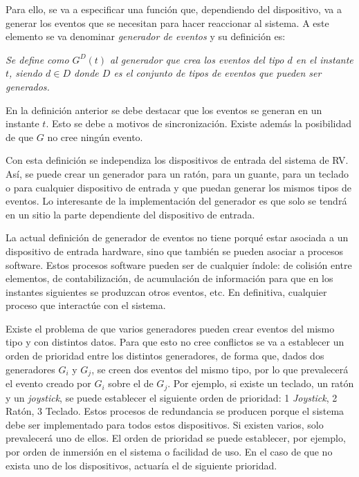 \documentclass{egpubl}
\begin{document}
Para ello, se va a especificar una funci\'on que, dependiendo del
dispositivo, va a generar los eventos que se necesitan para hacer
reaccionar al sistema. A este elemento se va denominar
\textit{generador de eventos} y su definici\'on es:


{\itshape
Se define como $G^{D}(t)$ al generador que crea los
eventos del tipo $d$ en el instante $t$, siendo $d \in D$ donde $D$ es el
conjunto de tipos de eventos que pueden ser generados.}


En la definici\'on anterior se debe destacar que los eventos se generan
en un instante $t$. Esto se debe a motivos de sincronizaci\'on. Existe
adem\'as la posibilidad de que $G$ no cree ning\'un evento.

Con esta definici\'on se independiza los dispositivos de entrada del
sistema de RV. As\'i, se puede crear un generador para un rat\'on,
para un guante, para un teclado o para cualquier dispositivo de entrada
y que puedan generar los mismos tipos de eventos. Lo interesante de la
implementaci\'on del generador es que solo se tendr\'a en un sitio la
parte dependiente del dispositivo de entrada.

La actual definici\'on de generador de eventos no tiene porqu\'e estar
asociada a un dispositivo de entrada hardware, sino que tambi\'en se
pueden asociar a procesos software. Estos procesos software pueden ser
de cualquier \'indole: de colisi\'on entre elementos, de
contabilizaci\'on, de acumulaci\'on de informaci\'on para que en los
instantes siguientes se produzcan otros eventos, etc. En definitiva,
cualquier proceso que interact\'ue con el sistema.

Existe el problema de que varios generadores pueden crear eventos del
mismo tipo y con distintos datos. Para que esto no cree conflictos se
va a establecer un orden de prioridad entre los distintos generadores,
de forma que, dados dos generadores $G_{i}$ y
$G_{j}$, se creen dos eventos del mismo tipo, por lo que
prevalecer\'a el evento creado por $G_{i}$ sobre el de
$G_{j}$. Por ejemplo, si existe un teclado, un rat\'on y un
\textit{joystick}, se puede establecer el siguiente orden de prioridad:
1{\textordmasculine} \textit{Joystick}, 2{\textordmasculine} Rat\'on,
3{\textordmasculine} Teclado. Estos procesos de redundancia se producen
porque el sistema debe ser implementado para todos estos
dispositivos. Si existen varios, solo prevalecer\'a uno de ellos. El
orden de prioridad se puede establecer, por ejemplo, por orden de
inmersi\'on en el sistema o facilidad de uso. En el caso de que no
exista uno de los dispositivos, actuar\'ia el de siguiente prioridad.
\end{document}
